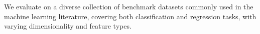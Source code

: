 \documentclass[runningheads]{llncs}
\begin{document}
We evaluate \ourapproach{} on a diverse collection of benchmark datasets commonly used in the machine learning literature,
covering both classification and regression tasks,
with varying dimensionality and feature types.
%
%
%
%
%
%
\end{document}
